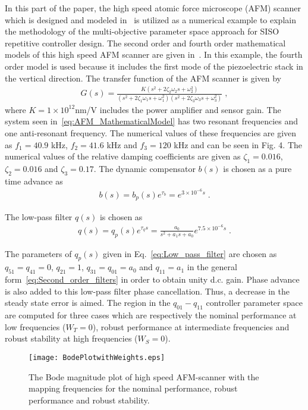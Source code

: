 \documentclass[12pt,draftcls,onecolumn]{IEEEtran}
\begin{document}
In this part of the paper, the high speed atomic force microscope (AFM) scanner which is designed and modeled in~\cite{SAD+:07} is utilized as a numerical example to explain the methodology of the multi-objective parameter space approach for SISO repetitive controller design. The second order and fourth order mathematical models of this high speed AFM scanner are given in~\cite{SAD+:07}. In this example, the fourth order model is used because it includes the first mode of the piezoelectric stack in the vertical direction. The transfer function of the AFM scanner is given by
\begin{align}
	G(s)=\frac{K(s^2+2\zeta_{2}\omega_{2}s+\omega_{2}^2)}{(s^2+2\zeta_{1}\omega_{1}s+\omega_{1}^2)(s^2+2\zeta_{3}\omega_{3}s+\omega_{3}^2)} \;, \label{eq:AFM_MathematicalModel}
\end{align}
where $K=1\times10^{12}$nm/V includes the power amplifier and sensor gain. The system seen in~\eqref{eq:AFM_MathematicalModel} has two resonant frequencies and one anti-resonant frequency. The numerical values of these frequencies are given as $f_{1}=40.9$ kHz, $f_{2}=41.6$ kHz and $f_{3}=120$ kHz and can be seen in Fig. 4. The numerical values of the relative damping coefficients are given as $\zeta_{1}=0.016$, $\zeta_{2}=0.016$ and $\zeta_{3}=0.17$. The dynamic compensator $b(s)$ is chosen as a pure time advance as
\begin{align}
	b(s)=b_{p}(s)e^{\tau_{b}}=e^{3\times10^{-6}s} \;.
\end{align}

The low-pass filter $q(s)$ is chosen as
\begin{align}
	q(s)=q_p(s)e^{\tau_{q}s}=\frac{a_{0}}{s^2+a_{1}s+a_{0}}e^{7.5\times10^{-6}s} \;.
	\label{eq:Low_pass_filter}
\end{align}

The parameters of $q_{p}(s)$ given in Eq.~\eqref{eq:Low_pass_filter} are chosen as $q_{51}=q_{41}=0$, $q_{21}=1$, $q_{31}=q_{01}=a_{0}$ and
$q_{11}=a_{1}$ in the general form~\eqref{eq:Second_order_filters} in order to obtain unity d.c. gain. Phase advance is also added to this low-pass filter phase cancellation. Thus, a decrease in the steady state error is aimed. The region in the $q_{01}-q_{11}$ controller parameter
space are computed for three cases which are respectively the nominal performance at low frequencies ($W_{T}=0$), robust
performance at intermediate frequencies and robust stability at high frequencies ($W_{S}=0$).

\begin{figure}\centering
    \texttt{[image: BodePlotwithWeights.eps]}\\
    \caption{The Bode magnitude plot of high speed AFM-scanner with the mapping
    frequencies for the nominal performance, robust performance and robust stability.}\end{figure}
\end{document}
